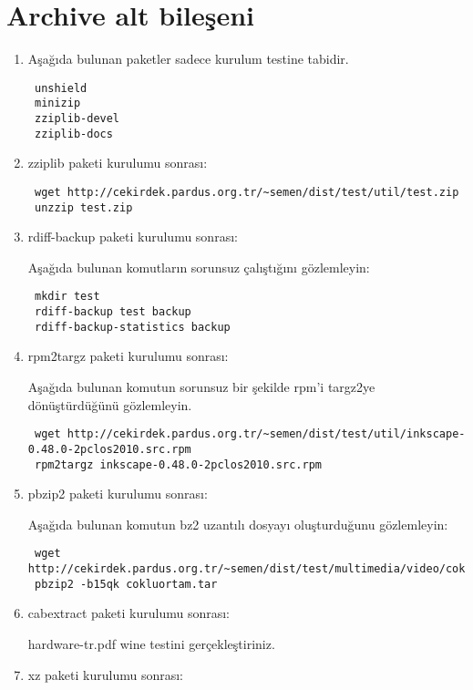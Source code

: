 \documentclass[a4paper,10pt]{article}
\begin{document}
\section{Archive alt bileşeni}
\begin{enumerate}
\item Aşağıda bulunan paketler sadece kurulum testine tabidir.
\begin{verbatim}
 unshield
 minizip
 zziplib-devel
 zziplib-docs
\end{verbatim}
\item zziplib paketi kurulumu sonrası:

\begin{verbatim}
 wget http://cekirdek.pardus.org.tr/~semen/dist/test/util/test.zip
 unzzip test.zip
\end{verbatim}

\item rdiff-backup paketi kurulumu sonrası:

Aşağıda bulunan komutların sorunsuz çalıştığını gözlemleyin:
\begin{verbatim}
 mkdir test
 rdiff-backup test backup
 rdiff-backup-statistics backup
\end{verbatim}

\item rpm2targz paketi kurulumu sonrası:

Aşağıda bulunan komutun sorunsuz bir şekilde rpm'i targz2ye dönüştürdüğünü gözlemleyin.
\begin{verbatim}
 wget http://cekirdek.pardus.org.tr/~semen/dist/test/util/inkscape-0.48.0-2pclos2010.src.rpm
 rpm2targz inkscape-0.48.0-2pclos2010.src.rpm
\end{verbatim}


\item pbzip2 paketi kurulumu sonrası:

Aşağıda bulunan komutun bz2 uzantılı dosyayı oluşturduğunu gözlemleyin:

\begin{verbatim}
 wget http://cekirdek.pardus.org.tr/~semen/dist/test/multimedia/video/cokluortam.tar
 pbzip2 -b15qk cokluortam.tar
\end{verbatim}

\item cabextract paketi kurulumu sonrası:

hardware-tr.pdf wine testini gerçekleştiriniz.

\item xz paketi kurulumu sonrası:


\end{enumerate}
\end{document}
